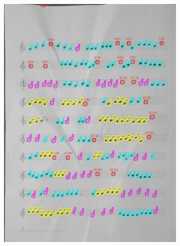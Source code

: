 \documentclass[11pt]{article}
\begin{document}
\begin{figure}[H]
    \centering
    \begin{subfigure}{.5\textwidth}
        \centering
        \graphicspath{ {blobs/} }
        \includegraphics[width=\linewidth]{21_cnts.jpg}
        \label{fig:sub1}
    \end{subfigure}%
    \begin{subfigure}{.5\textwidth}
        \centering
        \graphicspath{ {blobs/} }

\end{subfigure}
\end{figure}
\end{document}
